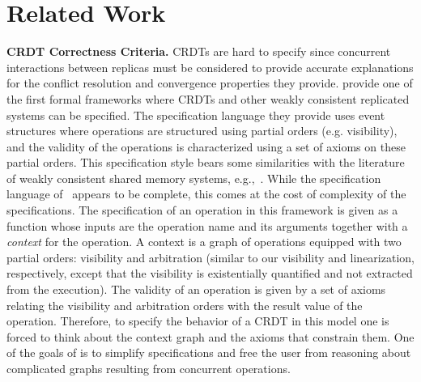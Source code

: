 \section{Related Work}
\label{sec:rel-work}

\noindent
{\bf CRDT Correctness Criteria.}
CRDTs are hard to specify since concurrent interactions between
replicas must be considered to provide accurate explanations for the
conflict resolution and convergence properties they provide.
%
\citet{BurckhardtGYZ14, Burckhardt14} provide one of the first formal
frameworks where CRDTs and other weakly consistent replicated systems
can be specified.
%
The specification language they provide uses event structures where
operations are structured using partial orders (e.g. visibility), and
the validity of the operations is characterized using a set of
axioms on these partial orders.
%
This specification style bears some similarities with the literature
of weakly consistent shared memory systems, e.g.,~\cite{AlglaveMT14}.
%
While the specification language
of~\cite{BurckhardtGYZ14,Burckhardt14} appears to be complete, this
comes at the cost of complexity of the specifications.
%
The specification of an operation in this framework is given as a
function whose inputs are the operation name and its arguments
together with a \emph{context} for the operation.
%
A context is a graph of operations equipped with two partial orders:
visibility and arbitration (similar to our visibility and linearization, respectively,
except that the visibility is existentially quantified and not extracted from the execution).
%
%
The validity of an operation is given by a set of axioms relating the
visibility and arbitration orders with the result value of the
operation.
%
Therefore, to specify the behavior of a CRDT in this model one is
forced to think about the context graph and the axioms that constrain
them.
%
One of the goals of \CRDTLinshort{} is to simplify specifications and
free the user from reasoning about complicated graphs resulting from
concurrent operations.

